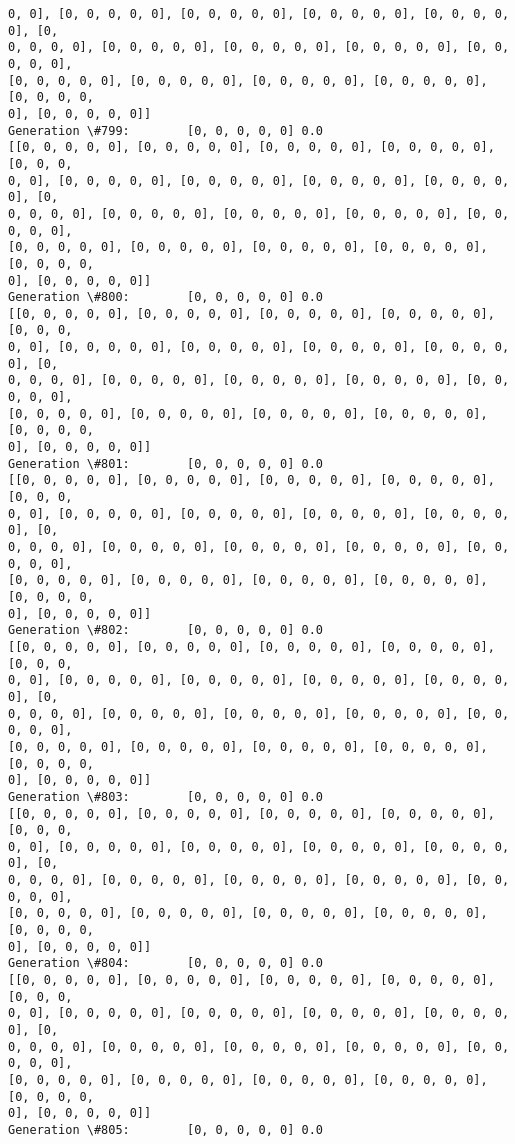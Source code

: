 \documentclass[11pt]{article}
\begin{document}
\begin{Verbatim}[commandchars=\\\{\}]
0, 0], [0, 0, 0, 0, 0], [0, 0, 0, 0, 0], [0, 0, 0, 0, 0], [0, 0, 0, 0, 0], [0,
0, 0, 0, 0], [0, 0, 0, 0, 0], [0, 0, 0, 0, 0], [0, 0, 0, 0, 0], [0, 0, 0, 0, 0],
[0, 0, 0, 0, 0], [0, 0, 0, 0, 0], [0, 0, 0, 0, 0], [0, 0, 0, 0, 0], [0, 0, 0, 0,
0], [0, 0, 0, 0, 0]]
Generation \#799:        [0, 0, 0, 0, 0] 0.0
[[0, 0, 0, 0, 0], [0, 0, 0, 0, 0], [0, 0, 0, 0, 0], [0, 0, 0, 0, 0], [0, 0, 0,
0, 0], [0, 0, 0, 0, 0], [0, 0, 0, 0, 0], [0, 0, 0, 0, 0], [0, 0, 0, 0, 0], [0,
0, 0, 0, 0], [0, 0, 0, 0, 0], [0, 0, 0, 0, 0], [0, 0, 0, 0, 0], [0, 0, 0, 0, 0],
[0, 0, 0, 0, 0], [0, 0, 0, 0, 0], [0, 0, 0, 0, 0], [0, 0, 0, 0, 0], [0, 0, 0, 0,
0], [0, 0, 0, 0, 0]]
Generation \#800:        [0, 0, 0, 0, 0] 0.0
[[0, 0, 0, 0, 0], [0, 0, 0, 0, 0], [0, 0, 0, 0, 0], [0, 0, 0, 0, 0], [0, 0, 0,
0, 0], [0, 0, 0, 0, 0], [0, 0, 0, 0, 0], [0, 0, 0, 0, 0], [0, 0, 0, 0, 0], [0,
0, 0, 0, 0], [0, 0, 0, 0, 0], [0, 0, 0, 0, 0], [0, 0, 0, 0, 0], [0, 0, 0, 0, 0],
[0, 0, 0, 0, 0], [0, 0, 0, 0, 0], [0, 0, 0, 0, 0], [0, 0, 0, 0, 0], [0, 0, 0, 0,
0], [0, 0, 0, 0, 0]]
Generation \#801:        [0, 0, 0, 0, 0] 0.0
[[0, 0, 0, 0, 0], [0, 0, 0, 0, 0], [0, 0, 0, 0, 0], [0, 0, 0, 0, 0], [0, 0, 0,
0, 0], [0, 0, 0, 0, 0], [0, 0, 0, 0, 0], [0, 0, 0, 0, 0], [0, 0, 0, 0, 0], [0,
0, 0, 0, 0], [0, 0, 0, 0, 0], [0, 0, 0, 0, 0], [0, 0, 0, 0, 0], [0, 0, 0, 0, 0],
[0, 0, 0, 0, 0], [0, 0, 0, 0, 0], [0, 0, 0, 0, 0], [0, 0, 0, 0, 0], [0, 0, 0, 0,
0], [0, 0, 0, 0, 0]]
Generation \#802:        [0, 0, 0, 0, 0] 0.0
[[0, 0, 0, 0, 0], [0, 0, 0, 0, 0], [0, 0, 0, 0, 0], [0, 0, 0, 0, 0], [0, 0, 0,
0, 0], [0, 0, 0, 0, 0], [0, 0, 0, 0, 0], [0, 0, 0, 0, 0], [0, 0, 0, 0, 0], [0,
0, 0, 0, 0], [0, 0, 0, 0, 0], [0, 0, 0, 0, 0], [0, 0, 0, 0, 0], [0, 0, 0, 0, 0],
[0, 0, 0, 0, 0], [0, 0, 0, 0, 0], [0, 0, 0, 0, 0], [0, 0, 0, 0, 0], [0, 0, 0, 0,
0], [0, 0, 0, 0, 0]]
Generation \#803:        [0, 0, 0, 0, 0] 0.0
[[0, 0, 0, 0, 0], [0, 0, 0, 0, 0], [0, 0, 0, 0, 0], [0, 0, 0, 0, 0], [0, 0, 0,
0, 0], [0, 0, 0, 0, 0], [0, 0, 0, 0, 0], [0, 0, 0, 0, 0], [0, 0, 0, 0, 0], [0,
0, 0, 0, 0], [0, 0, 0, 0, 0], [0, 0, 0, 0, 0], [0, 0, 0, 0, 0], [0, 0, 0, 0, 0],
[0, 0, 0, 0, 0], [0, 0, 0, 0, 0], [0, 0, 0, 0, 0], [0, 0, 0, 0, 0], [0, 0, 0, 0,
0], [0, 0, 0, 0, 0]]
Generation \#804:        [0, 0, 0, 0, 0] 0.0
[[0, 0, 0, 0, 0], [0, 0, 0, 0, 0], [0, 0, 0, 0, 0], [0, 0, 0, 0, 0], [0, 0, 0,
0, 0], [0, 0, 0, 0, 0], [0, 0, 0, 0, 0], [0, 0, 0, 0, 0], [0, 0, 0, 0, 0], [0,
0, 0, 0, 0], [0, 0, 0, 0, 0], [0, 0, 0, 0, 0], [0, 0, 0, 0, 0], [0, 0, 0, 0, 0],
[0, 0, 0, 0, 0], [0, 0, 0, 0, 0], [0, 0, 0, 0, 0], [0, 0, 0, 0, 0], [0, 0, 0, 0,
0], [0, 0, 0, 0, 0]]
Generation \#805:        [0, 0, 0, 0, 0] 0.0

\end{Verbatim}
\end{document}
